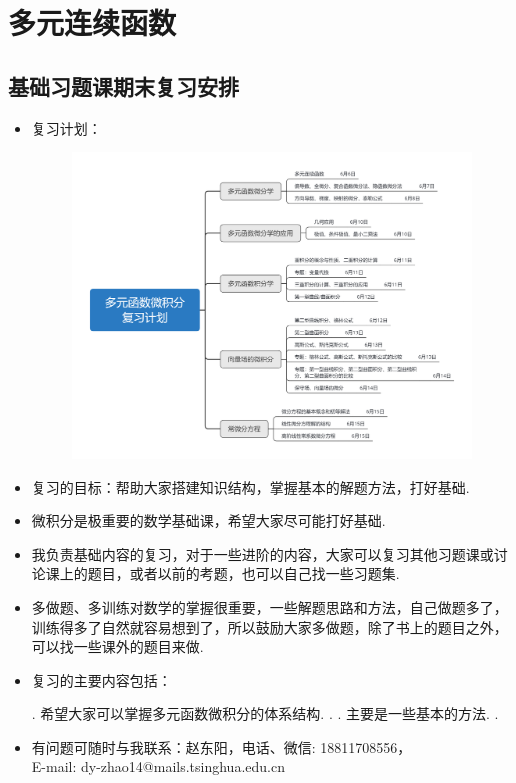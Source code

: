 \documentclass[12pt,UTF8]{ctexart}
\begin{document}
\setcounter{section}{0}
\section{多元连续函数}
\noindent
\subsection{基础习题课期末复习安排}
\begin{itemize}
\item 复习计划：
\begin{figure}[H]
\begin{center}
\includegraphics[height=0.5\textheight]{Figures20190605/plan.png}
\end{center}
\end{figure}
\item 复习的目标：帮助大家搭建知识结构，掌握基本的解题方法，打好基础.
\item 微积分是极重要的数学基础课，希望大家尽可能打好基础.
\item 我负责基础内容的复习，对于一些进阶的内容，大家可以复习其他习题课或讨论课上的题目，或者以前的考题，也可以自己找一些习题集.
\item 多做题、多训练对数学的掌握很重要，一些解题思路和方法，自己做题多了，训练得多了自然就容易想到了，所以鼓励大家多做题，除了书上的题目之外，可以找一些课外的题目来做.
\item 复习的主要内容包括：
\begin{enumerate}
. 希望大家可以掌握多元函数微积分的体系结构.
.
. 主要是一些基本的方法.
.
\end{enumerate}
\item 有问题可随时与我联系：赵东阳，电话、微信: 18811708556，\\
E-mail: dy-zhao14@mails.tsinghua.edu.cn
\end{itemize}
\end{document}
